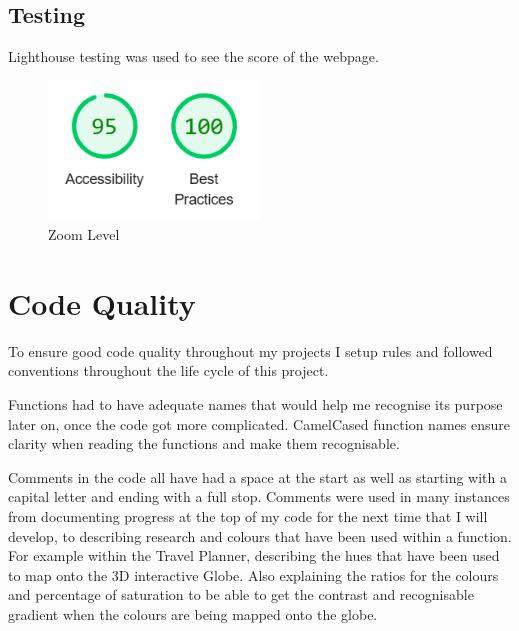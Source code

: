 \documentclass[]{project_final}
\begin{document}
\subsection{Testing}
Lighthouse testing was used to see the score of the webpage.

\begin{figure}[ht!]
    \centering
    \includegraphics[width=0.5\textwidth]{lighthouseAG.png}
    \vspace*{0.0cm}
    \caption{Zoom Level}
    \label{fig:1}
\end{figure}

\section{Code Quality}
To ensure good code quality throughout my projects I setup rules and followed conventions throughout the life cycle of this project.

Functions had to have adequate names that would help me recognise its purpose later on, once the code got more complicated. CamelCased function names ensure clarity when reading the functions and make them recognisable.

Comments in the code all have had a space at the start as well as starting with a capital letter and ending with a full stop. Comments were used in many instances from documenting progress at the top of my code for the next time that I will develop, to describing research and colours that have been used within a function. For example within the Travel Planner, describing the hues that have been used to map onto the 3D interactive Globe. Also explaining the ratios for the colours and percentage of saturation to be able to get the contrast and recognisable gradient when the colours are being mapped onto the globe.
\end{document}
